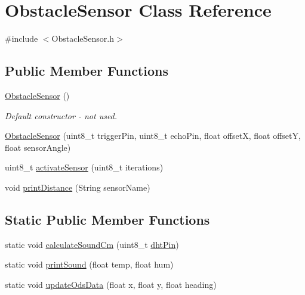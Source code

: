 \hypertarget{class_obstacle_sensor}{}\section{Obstacle\+Sensor Class Reference}
\label{class_obstacle_sensor}


{\ttfamily \#include $<$Obstacle\+Sensor.\+h$>$}

\subsection*{Public Member Functions}
\begin{DoxyCompactItemize}
\item 
\mbox{\hyperlink{class_obstacle_sensor_ad1268ce55070472bf5ca463a919d1dd5}{Obstacle\+Sensor}} ()
\begin{DoxyCompactList}\small\item\em Default constructor -\/ not used. \end{DoxyCompactList}\item 
\mbox{\hyperlink{class_obstacle_sensor_ab4d5163bae4a841311d37df28be7872b}{Obstacle\+Sensor}} (uint8\+\_\+t trigger\+Pin, uint8\+\_\+t echo\+Pin, float offsetX, float offsetY, float sensor\+Angle)
\item 
uint8\+\_\+t \mbox{\hyperlink{class_obstacle_sensor_ae451cef8461f01b1672fcf4dd18eb6de}{activate\+Sensor}} (uint8\+\_\+t iterations)
\item 
void \mbox{\hyperlink{class_obstacle_sensor_ad7b512504389e1925d3777f7395ef3ae}{print\+Distance}} (String sensor\+Name)
\end{DoxyCompactItemize}
\subsection*{Static Public Member Functions}
\begin{DoxyCompactItemize}
\item 
static void \mbox{\hyperlink{class_obstacle_sensor_a309eb490fce98867856521dd270f6e97}{calculate\+Sound\+Cm}} (uint8\+\_\+t \mbox{\hyperlink{bot_main_8ino_a89e40ffdf0114ea60292ff57879491e2}{dht\+Pin}})
\item 
static void \mbox{\hyperlink{class_obstacle_sensor_a66ce921e669bb83fa8f23ad2bc2733ee}{print\+Sound}} (float temp, float hum)
\item 
static void \mbox{\hyperlink{class_obstacle_sensor_a15dc53a9c498c7d959178ae903cf7a40}{update\+Ods\+Data}} (float x, float y, float heading)
\end{DoxyCompactItemize}
